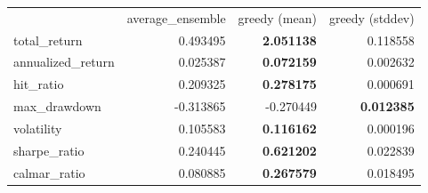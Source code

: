 \begin{tabular}{lrrr}
 & average_ensemble & greedy (mean) & greedy (stddev) \\
total_return & 0.493495 & \bfseries 2.051138 & 0.118558 \\
annualized_return & 0.025387 & \bfseries 0.072159 & 0.002632 \\
hit_ratio & 0.209325 & \bfseries 0.278175 & 0.000691 \\
max_drawdown & -0.313865 & -0.270449 & \bfseries 0.012385 \\
volatility & 0.105583 & \bfseries 0.116162 & 0.000196 \\
sharpe_ratio & 0.240445 & \bfseries 0.621202 & 0.022839 \\
calmar_ratio & 0.080885 & \bfseries 0.267579 & 0.018495 \\
\end{tabular}
